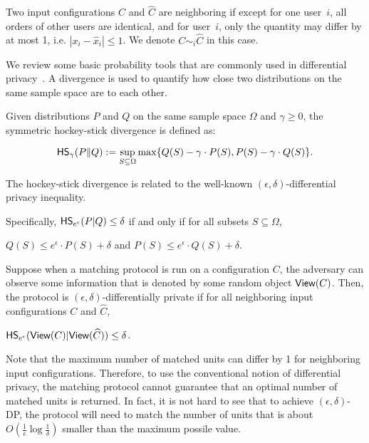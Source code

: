 \begin{definition} 
Two input configurations $C$ and $\widehat{C}$ are neighboring if except for one user~$i$, all orders of other users are identical, and for user~$i$, only the quantity may differ by at most 1, i.e. $|x_i - \widehat{x}_i| \leq 1$. We denote $C \sim_i \widehat{C}$ in this case. 
\end{definition}





We review some basic probability tools that are commonly used in differential privacy~\cite{DBLP:conf/icalp/Dwork06}. A divergence is used to quantify how close two distributions on the same sample space are to each other.

\begin{definition}  
Given distributions $P$ and $Q$ on the same sample space $\Omega$ and $\gamma \geq 0$, the symmetric hockey-stick divergence is defined as:

$$ {\sf HS}_\gamma(P \| Q) := \sup_{S \subseteq \Omega} \max\{ Q(S) - \gamma \cdot P(S), P(S) - \gamma \cdot Q(S)\}.$$

\end{definition}

\begin{remark} The hockey-stick divergence is related to the well-known $(\epsilon, \delta)$-differential privacy inequality. 

Specifically, ${\sf HS}_{e^\epsilon} (P | Q) \leq \delta$ if and only if for all subsets $S \subseteq \Omega$, 

$Q(S) \leq e^\epsilon \cdot P(S) + \delta$ and $P(S) \leq e^\epsilon \cdot Q(S) + \delta$. \end{remark}

\begin{definition} Suppose when a matching protocol is run on a configuration $C$, the adversary can observe some information that is denoted by some random object ${\mathsf {View}}(C)$. Then, the protocol is $(\epsilon, \delta)$-differentially private if for all neighboring input configurations $C$ and $\widehat{C}$,

${\sf HS}_{e^\epsilon}({\mathsf {View}}(C) | {\mathsf {View}}(\widehat{C})) \leq \delta$. \end{definition}


Note that the maximum number of matched units can differ by 1 for neighboring input configurations. Therefore, to use the conventional notion of differential privacy, the matching protocol cannot guarantee that an optimal number of matched units is returned. In fact, it is not hard to see that to achieve $(\epsilon, \delta)$-DP, the protocol will need to match the number of units that is about $O(\frac{1}{\epsilon} \log \frac{1}{\delta})$ smaller than the maximum possile value.

